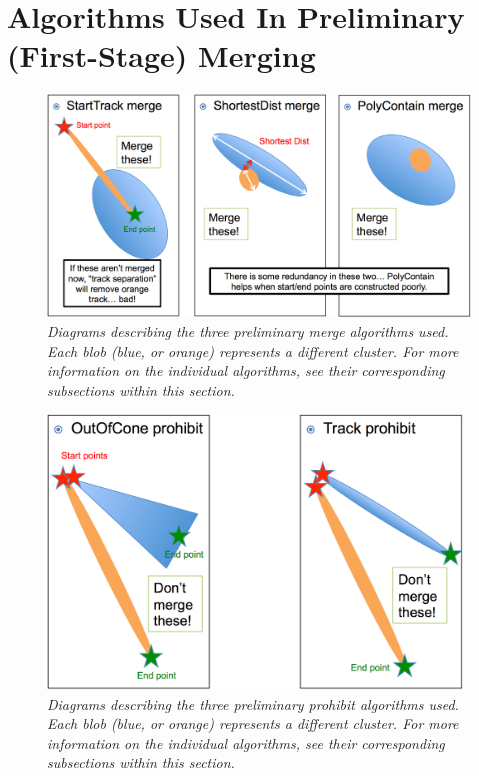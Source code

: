 \documentclass{article}
\begin{document}
\section{Algorithms Used In Preliminary (First-Stage) Merging}\label{sec:PrelimMerging}

\begin{figure}[h!]
\begin{center}
\includegraphics[width=150mm]{Figures/prelim_merge_algos.png}
\end{center}
\caption{\textit{Diagrams describing the three preliminary merge algorithms used. Each blob (blue, or orange) represents a different cluster. For more information on the individual algorithms, see their corresponding subsections within this section.}}
\label{prelim_merge_algos_fig}
\end{figure}

\begin{figure}[h!]
\begin{center}
\includegraphics[width=110mm]{Figures/prelim_prohibit_algos.png}
\end{center}
\caption{\textit{Diagrams describing the three preliminary prohibit algorithms used. Each blob (blue, or orange) represents a different cluster. For more information on the individual algorithms, see their corresponding subsections within this section.}}
\label{prelim_prohibit_algos_fig}
\end{figure}
\end{document}
